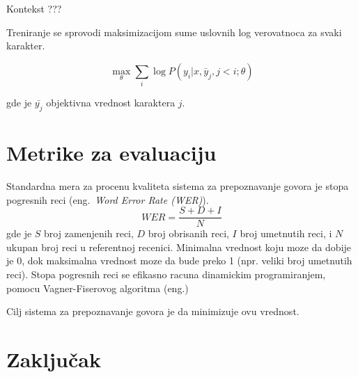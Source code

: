 \documentclass[a4paper]{article}
\begin{document}
\bigskip

Kontekst ???

Treniranje se sprovodi maksimizacijom sume uslovnih log verovatnoca za svaki karakter.

 \begin{equation}
\label{eq:max}
\max_{\theta} \sum_i \log P(y_i | x,  \bar{y}_j,  j < i; \theta)
\end{equation}

gde je $\bar{y_j}$ objektivna vrednost karaktera $j$.

\section{Metrike za evaluaciju}
Standardna mera za procenu kvaliteta sistema za prepoznavanje govora je stopa pogresnih reci (eng.~{\em Word Error Rate (WER)}).
\begin{equation*}
  WER = \frac{S + D + I}{N}
\end{equation*}
gde je $S$ broj zamenjenih reci, $D$ broj obrisanih reci, $I$ broj umetnutih reci, i $N$ ukupan broj reci u referentnoj recenici.
Minimalna vrednost koju moze da dobije je 0, dok maksimalna vrednost moze da bude preko 1 (npr. veliki broj umetnutih reci).
Stopa pogresnih reci se efikasno racuna dinamickim programiranjem, pomocu Vagner-Fiserovog algoritma (eng.)

Cilj sistema za prepoznavanje govora je da minimizuje ovu vrednost.

\section{Zaključak}
\label{sec:zakljucak}

\end{document}
